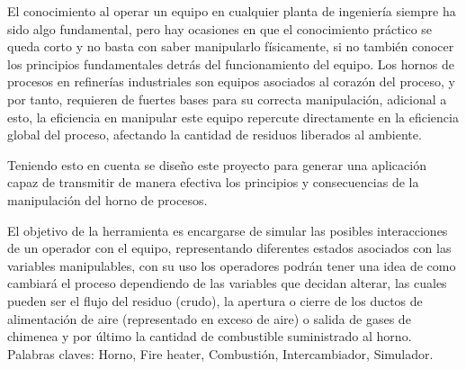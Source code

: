 \documentclass[pregrado]{tesis-usb}
\begin{document}
\frontmatter
\maketitle


\begin{resumen}
     El conocimiento al operar un equipo en cualquier planta de ingeniería siempre ha sido algo fundamental, pero hay ocasiones en que el conocimiento práctico se queda corto y no basta con saber manipularlo físicamente, si no también conocer los principios fundamentales detrás del funcionamiento del equipo. Los hornos de procesos en refinerías industriales son equipos asociados al corazón del proceso, y por tanto, requieren de fuertes bases para su correcta manipulación, adicional a esto, la eficiencia en manipular este equipo repercute directamente en la eficiencia global del proceso, afectando la cantidad de residuos liberados al ambiente.
     
     Teniendo esto en cuenta se diseño este proyecto para generar una aplicación capaz de transmitir de manera efectiva los principios y consecuencias de la manipulación del horno de procesos. 
     
     El objetivo de la herramienta es encargarse de simular las posibles interacciones de un operador con el equipo, representando diferentes estados asociados con las variables manipulables, con su uso los operadores podrán tener una idea de como cambiará el proceso dependiendo de las variables que decidan alterar, las cuales pueden ser el flujo del residuo (crudo), la apertura o cierre de los ductos de alimentación de aire (representado en exceso de aire) o salida de gases de chimenea y por último la cantidad de combustible suministrado al horno.
     \vspace{15pt}
     Palabras claves: Horno, Fire heater, Combustión, Intercambiador, Simulador.
\end{resumen}
\tableofcontents
\listoffigures
\listoftables
\useacronyms


\mainmatter






%
%

\nocite{*}

\appendix


\end{document}
